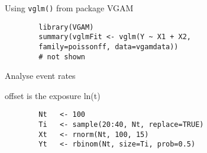 \documentclass{beamer}
\begin{document}
%		
%		
%		
%		
%		
%		
	\begin{frame}[fragile]
		Using \texttt{vglm()} from package VGAM	
		
		\begin{verbatim}
		library(VGAM)
		summary(vglmFit <- vglm(Y ~ X1 + X2, 
		family=poissonff, data=vgamdata))
		# not shown
		\end{verbatim}
		
		Analyse event rates
	\end{frame}
	\begin{frame}[fragile]
		offset is the exposure ln(t)
		
		\begin{verbatim}
		Nt   <- 100
		Ti   <- sample(20:40, Nt, replace=TRUE)
		Xt   <- rnorm(Nt, 100, 15)
		Yt   <- rbinom(Nt, size=Ti, prob=0.5)
		\end{verbatim}
	\end{frame}
\end{document}
